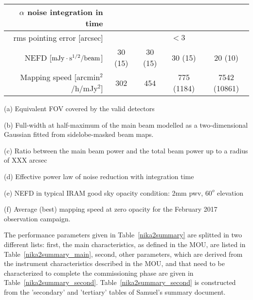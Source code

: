 \begin{table}[h]
\begin{threeparttable}
\begin{tabular}{|r|c|c|c|c|}
      \hline
      $\alpha$ noise integration in time\tnote{d}\hspace{1mm}  &   &   &   &  \\
      \hline
      rms pointing error    [arcsec]    & \multicolumn{4}{|c|}{$<3$}  \\
      \hline
      NEFD\tnote{e}\hspace{1mm}   [$\rm{mJy} \cdot \rm{s}^{1/2}/\rm{beam}$]  &  30 (15)   & 30 (15)  &  30 (15)  & 20 (10) \\
      Mapping speed\tnote{f}\hspace{1mm} [arcmin$^2$/h/mJy$^2$] & 302  & 454  & 775 (1184)  & 7542 (10861)  \\
\hline

\end{tabular}
  \begin{tablenotes}
    
  \item[(a)] Equivalent FOV covered by the valid detectors
  \item[(b)] Full-width at half-maximum of the main beam modelled as a two-dimensional Gaussian fitted from sidelobe-masked beam maps.
  \item[(c)]  Ratio between the main beam power and the total beam power up to a radius of XXX arcsec
  \item[(d)] Effective power law of noise reduction with integration time
  \item[(e)] NEFD in typical IRAM good sky opacity condition: 2mm pwv, $60^o$ elevation
  \item[(f)] Average (best) mapping speed at zero opacity for the February 2017 observation campaign. 

  \end{tablenotes}
\end{threeparttable}
\end{table}


The performance parameters given in Table~\ref{nika2summary} are splitted in two different lists: first, the main characteristics, as defined in the MOU, are listed in Table~\ref{nika2summary_main}, second, other parameters, which are derived from the instrument characteristics described in the MOU, and that need to be characterized to complete the commissioning phase are given in Table~\ref{nika2summary_second}. Table~\ref{nika2summary_second} is constructed from the 'secondary' and 'tertiary' tables of Samuel's summary document. 

